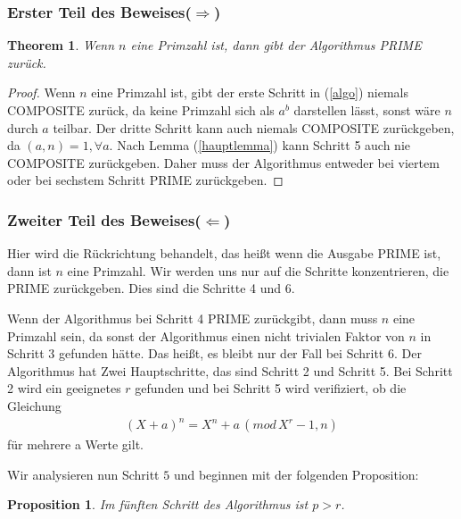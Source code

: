 \documentclass[12pt,oneside]{article}
\newtheorem{theorem}{Theorem}[section]
\newtheorem{prop}{Proposition}[section]
\theoremstyle{remark}
\theoremstyle{definition}
\begin{document}
\subsubsection{Erster Teil des Beweises($\Rightarrow$)}
\begin{theorem}\label{hin_rich}
Wenn $n$ eine Primzahl ist, dann gibt der Algorithmus PRIME zurück.
\end{theorem}

\begin{proof}
Wenn $n$ eine Primzahl ist, gibt der erste Schritt in (\ref{algo}) niemals COMPOSITE zurück, da keine Primzahl sich als $a^b$ darstellen lässt, sonst wäre $n$ durch $a$ teilbar. Der dritte Schritt kann auch niemals COMPOSITE zurückgeben, da $(a,n) = 1, \forall a$. Nach Lemma (\ref{hauptlemma}) kann Schritt 5 auch nie COMPOSITE zurückgeben. Daher muss der Algorithmus entweder bei viertem oder bei sechstem Schritt PRIME zurückgeben.  
\end{proof}

\subsubsection{Zweiter Teil des Beweises($\Leftarrow$)}

Hier wird die Rückrichtung behandelt, das heißt wenn die Ausgabe PRIME ist, dann ist $n$ eine Primzahl. Wir werden uns nur auf die Schritte konzentrieren, die PRIME zurückgeben. Dies sind die Schritte 4 und 6.\newline

Wenn der Algorithmus bei Schritt 4 PRIME zurückgibt, dann muss $n$ eine Primzahl sein, da sonst der Algorithmus einen nicht trivialen Faktor von $n$ in Schritt 3 gefunden hätte. Das heißt, es bleibt nur der Fall bei Schritt 6. Der Algorithmus hat Zwei Hauptschritte, das sind Schritt 2 und Schritt 5. Bei Schritt 2 wird ein geeignetes $r$ gefunden und bei Schritt 5 wird verifiziert, ob die Gleichung
\begin{align*}
    (X + a)^n = X^n + a \, (mod  \, X^r - 1, n)
\end{align*}
für mehrere a Werte gilt.\newline

\smallskip



\smallskip



Wir analysieren nun Schritt $5$ und beginnen mit der folgenden Proposition:

\begin{prop}\label{pGreaterThnr}
Im fünften Schritt des Algorithmus ist $p > r$.
\end{prop}
\end{document}
